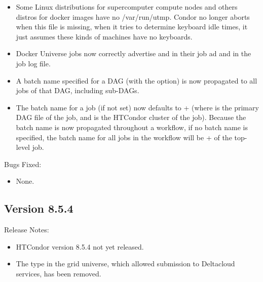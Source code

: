 \begin{itemize}

\item Some Linux distributions for supercomputer compute nodes and
others distros for docker images have no /var/run/utmp.  Condor no longer
aborts when this file is missing, when it tries to determine keyboard
idle times, it just assumes these kinds of machines have no keyboards.

\item Docker Universe jobs now correctly advertise 
and  in their job ad and in the job log file.

\item A batch name specified for a DAG (with the 
 option) is now propagated to all jobs of that DAG,
including sub-DAGs.

\item The batch name for a  job (if not set) now
defaults to + (where 
is the primary DAG file of the  job, and 
is the HTCondor cluster of the  job).
Because the batch name is now propagated throughout a workflow, if
no batch name is specified, the batch name for all jobs in the
workflow will be + of the top-level
 job.

\end{itemize}

\noindent Bugs Fixed:

\begin{itemize}

\item None.

\end{itemize}

\subsection*{\label{sec:New-8-5-4}Version 8.5.4}

\noindent Release Notes:

\begin{itemize}

\item HTCondor version 8.5.4 not yet released.

\item The  type in the grid universe, which allowed
submission to Deltacloud services, has been removed.

\end{itemize}


